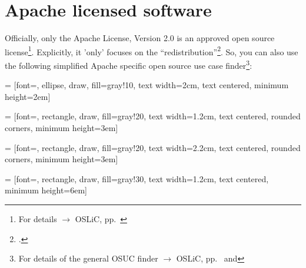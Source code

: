 %
%
%
%
%



\section{Apache licensed software}

Officially, only the Apache License, Version 2.0 is an approved open source
license\footnote{For details $\rightarrow$ OSLiC, pp.\
\pageref{sec:ProtectPowerOfApL}}.
Explicitly, it 'only' focuses on the
\enquote{redistribution}\footcite[cf.][\nopage wp. §4]{OSI2012b}. So, you can
also use the following simplified Apache specific open source use case
finder\footnote{For details of the general OSUC finder $\rightarrow$ OSLiC, pp.\
\pageref{OsucTokens} and \pageref{OsucDefinitionTree}}:
 
 = [font=\small, ellipse, draw, fill=gray!10, 
    text width=2cm, text centered, minimum height=2em]

 = [font=\footnotesize, rectangle, draw, fill=gray!20, 
    text width=1.2cm, text centered, rounded corners, minimum height=3em]

\tikzstyle{nodb} = [font=\footnotesize, rectangle, draw, fill=gray!20, 
    text width=2.2cm, text centered, rounded corners, minimum height=3em]
    
\tikzstyle{leaf} = [font=\tiny, rectangle, draw, fill=gray!30, 
    text width=1.2cm, text centered, minimum height=6em]

